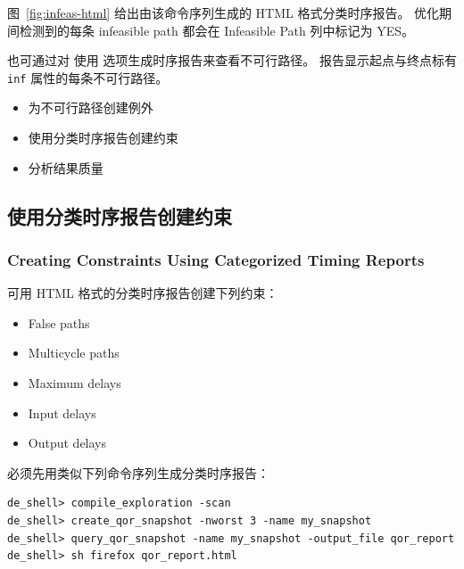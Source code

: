 图~\ref{fig:infeas-html} 给出由该命令序列生成的 HTML 格式分类时序报告。
优化期间检测到的每条 infeasible path 都会在 Infeasible Path 列中标记为 YES。


也可通过对  使用  选项生成时序报告来查看不可行路径。
报告显示起点与终点标有 \texttt{inf} 属性的每条不可行路径。

\begin{seeAlsoBox}
\begin{itemize}
  \item 为不可行路径创建例外
  \item 使用分类时序报告创建约束
  \item 分析结果质量
\end{itemize}
\end{seeAlsoBox}

\subsection{使用分类时序报告创建约束}
\subsubsection*{Creating Constraints Using Categorized Timing Reports}

可用 HTML 格式的分类时序报告创建下列约束：
\begin{itemize}
  \item False paths
  \item Multicycle paths
  \item Maximum delays
  \item Input delays
  \item Output delays
\end{itemize}

\begin{noteBox}
必须先用类似下列命令序列生成分类时序报告：
\begin{lstlisting}
de_shell> compile_exploration -scan
de_shell> create_qor_snapshot -nworst 3 -name my_snapshot
de_shell> query_qor_snapshot -name my_snapshot -output_file qor_report
de_shell> sh firefox qor_report.html
\end{lstlisting}
\end{noteBox}


